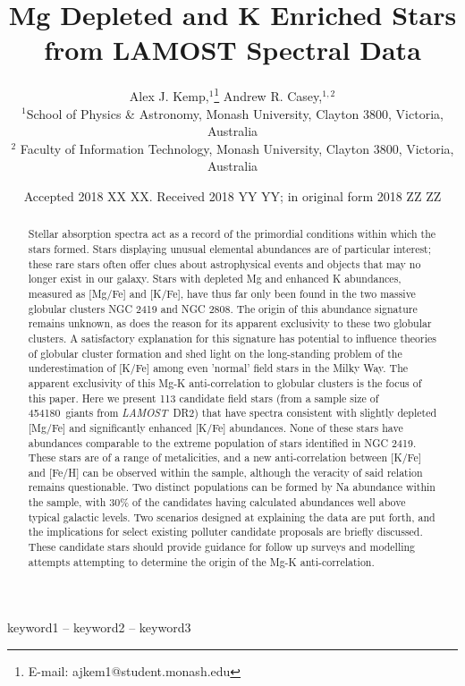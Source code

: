 \documentclass[a4paper,fleqn,usenatbib]{mnras}
\title[Short title, max. 45 characters]{Mg Depleted and K Enriched Stars from LAMOST Spectral Data}
\author[Kemp et al.]{
Alex J. Kemp,$^{1}$\thanks{E-mail: ajkem1@student.monash.edu}
Andrew R. Casey,$^{1,2}$
\\
$^{1}$School of Physics \& Astronomy, Monash University, Clayton 3800, Victoria, Australia\\
$^{2}$ Faculty of Information Technology, Monash University, Clayton 3800, Victoria, Australia\\
}
\date{Accepted 2018 XX XX. Received 2018 YY YY; in original form 2018 ZZ ZZ}
\newcommand{\LamostGiants}{454180}
\newcommand{\project}[1]{\emph{#1}}
\newcommand{\lamost}{\project{LAMOST}}
\begin{document}
\label{firstpage}
\pagerange{\pageref{firstpage}--\pageref{lastpage}}
\maketitle

\begin{abstract}

Stellar absorption spectra act as a record of the primordial conditions within which the stars formed. Stars displaying unusual elemental abundances are of particular interest; these rare stars often offer clues about astrophysical events and objects that may no longer exist in our galaxy. Stars with  depleted Mg and enhanced K abundances, measured as [Mg/Fe] and [K/Fe], have thus far only been found in the two massive globular clusters NGC 2419 and NGC 2808. The origin of this abundance signature remains unknown, as does the reason for its apparent exclusivity to these two globular clusters. A satisfactory explanation for this signature has potential to influence theories of globular cluster formation and shed light on the long-standing problem of the underestimation of [K/Fe] among even 'normal' field stars in the Milky Way. The apparent exclusivity of this Mg-K anti-correlation to globular clusters is the focus of this paper. Here we present 113 candidate field stars (from a sample size of \LamostGiants \ giants from \lamost \ DR2) that have spectra consistent with slightly depleted [Mg/Fe] and significantly enhanced [K/Fe] abundances. None of these stars have abundances comparable to the extreme population of stars identified in NGC 2419. These stars are of a range of metalicities, and a new anti-correlation between [K/Fe] and [Fe/H] can be observed within the sample, although the veracity of said relation remains questionable. Two distinct populations can be formed by Na abundance within the sample, with 30\% of the candidates having calculated abundances well above typical galactic levels. Two scenarios designed at explaining the data are put forth, and the implications for select existing polluter candidate proposals are briefly discussed. These candidate stars should provide guidance for follow up surveys and modelling attempts attempting to determine the origin of the Mg-K anti-correlation.



\end{abstract}

\begin{keywords}
keyword1 -- keyword2 -- keyword3
\end{keywords}
\end{document}

